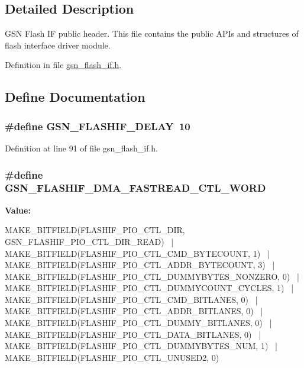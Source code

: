 \subsection{Detailed Description}
GSN Flash IF public header. This file contains the public APIs and structures of flash interface driver module. 

Definition in file \hyperlink{a00501_source}{gsn\_\-flash\_\-if.h}.



\subsection{Define Documentation}
\hypertarget{a00501_afbf57cb7ab68e072618c64e3f5710edc}{
\subsubsection[{GSN\_\-FLASHIF\_\-DELAY}]{\setlength{\rightskip}{0pt plus 5cm}\#define GSN\_\-FLASHIF\_\-DELAY~10}}
\label{a00501_afbf57cb7ab68e072618c64e3f5710edc}


Definition at line 91 of file gsn\_\-flash\_\-if.h.

\hypertarget{a00501_ad74448da0c4a43b719fb51724b212002}{
\subsubsection[{GSN\_\-FLASHIF\_\-DMA\_\-FASTREAD\_\-CTL\_\-WORD}]{\setlength{\rightskip}{0pt plus 5cm}\#define GSN\_\-FLASHIF\_\-DMA\_\-FASTREAD\_\-CTL\_\-WORD}}
\label{a00501_ad74448da0c4a43b719fb51724b212002}
{\bfseries Value:}
\begin{DoxyCode}
MAKE_BITFIELD(FLASHIF_PIO_CTL_DIR, GSN_FLASHIF_PIO_CTL_DIR_READ) \
    | MAKE_BITFIELD(FLASHIF_PIO_CTL_CMD_BYTECOUNT, 1) \
    | MAKE_BITFIELD(FLASHIF_PIO_CTL_ADDR_BYTECOUNT, 3) \
    | MAKE_BITFIELD(FLASHIF_PIO_CTL_DUMMYBYTES_NONZERO, 0) \
    | MAKE_BITFIELD(FLASHIF_PIO_CTL_DUMMYCOUNT_CYCLES, 1) \
    | MAKE_BITFIELD(FLASHIF_PIO_CTL_CMD_BITLANES, 0) \
    | MAKE_BITFIELD(FLASHIF_PIO_CTL_ADDR_BITLANES, 0) \
    | MAKE_BITFIELD(FLASHIF_PIO_CTL_DUMMY_BITLANES, 0) \
    | MAKE_BITFIELD(FLASHIF_PIO_CTL_DATA_BITLANES, 0) \
    | MAKE_BITFIELD(FLASHIF_PIO_CTL_DUMMYBYTES_NUM, 1) \
    | MAKE_BITFIELD(FLASHIF_PIO_CTL_UNUSED2, 0)
\end{DoxyCode}


